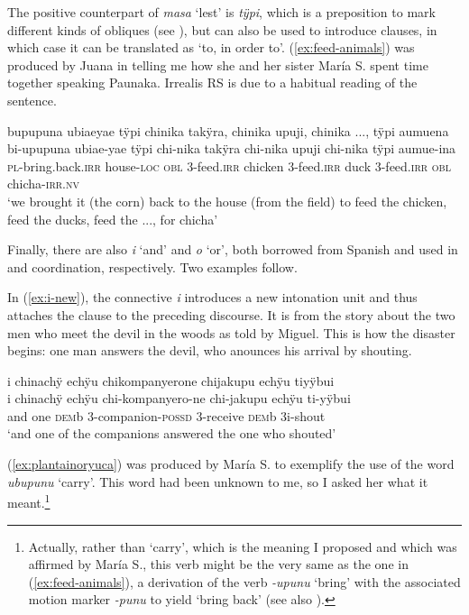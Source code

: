 
The positive counterpart of \textit{masa} ‘lest’ is \textit{tÿpi}, which is a preposition to mark different kinds of obliques (see ), but can also be used to introduce  clauses, in which case it can be translated as ‘to, in order to’. (\ref{ex:feed-animals}) was produced by Juana in telling me how she and her sister María S. spent time together speaking Paunaka. Irrealis RS is due to a habitual reading of the sentence.

\newpage
\ea\label{ex:feed-animals}
\begingl
\glpreamble bupupuna ubiaeyae tÿpi chinika takÿra, chinika upuji, chinika ..., tÿpi aumuena\\
\gla bi-upupuna ubiae-yae tÿpi chi-nika takÿra chi-nika upuji chi-nika tÿpi aumue-ina\\
\textsc{pl}-bring.back.\textsc{irr} house-\textsc{loc} \textsc{obl} 3-feed.\textsc{irr} chicken 3-feed.\textsc{irr} duck 3-feed.\textsc{irr} \textsc{obl} chicha-\textsc{irr.nv}\\
\glft ‘we brought it (the corn) back to the house (from the field) to feed the chicken, feed the ducks, feed the ..., for chicha’
\endgl
\trailingcitation{[jxx-p120430l-1.055]}
\xe

Finally, there are also \textit{i} ‘and’ and \textit{o} ‘or’, both borrowed from Spanish and used in  and  coordination, respectively. Two examples follow.

In (\ref{ex:i-new}), the connective \textit{i} introduces a new intonation unit and thus attaches the clause to the preceding discourse. It is from the story about the two men who meet the devil in the woods as told by Miguel. This is how the disaster begins: one man answers the devil, who anounces his arrival by shouting.

\ea\label{ex:i-new}
\begingl
\glpreamble i chinachÿ echÿu chikompanyerone chijakupu echÿu tiyÿbui\\
\gla i chinachÿ echÿu chi-kompanyero-ne chi-jakupu echÿu ti-yÿbui\\
\glb and one \textsc{dem}b 3-companion-\textsc{possd} 3-receive \textsc{dem}b 3i-shout\\
\glft ‘and one of the companions answered the one who shouted’
\endgl
\trailingcitation{[mxx-n101017s-1.021]}
\xe

(\ref{ex:plantainoryuca}) was produced by María S. to exemplify the use of the word \textit{ubupunu} ‘carry’. This word had been unknown to me, so I asked her what it meant.\footnote{Actually, rather than ‘carry’, which is the meaning I proposed and which was affirmed by María S., this verb might be the very same as the one in (\ref{ex:feed-animals}), a derivation of the verb \textit{-upunu} ‘bring’ with the associated motion marker \textit{-punu} to yield ‘bring back’ (see also ).}


